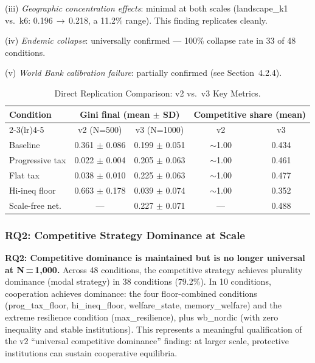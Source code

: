 \documentclass[12pt, letterpaper]{article}
\begin{document}
\noindent
(iii) \emph{Geographic concentration effects}: minimal at both scales
(landscape\_k1 vs.\ k6: 0.196\,$\to$\,0.218, a 11.2\% range). This finding
replicates cleanly.

\noindent
(iv) \emph{Endemic collapse}: universally confirmed --- 100\% collapse
rate in 33 of 48 conditions.

\noindent
(v) \emph{World Bank calibration failure}: partially confirmed (see
Section~4.2.4).

\begin{table}[h]
\centering
\caption{Direct Replication Comparison: v2 vs.\ v3 Key Metrics.}
\label{tab:replication}
\small
\begin{tabular}{lcccc}
\toprule
Condition & \multicolumn{2}{c}{Gini final (mean $\pm$ SD)} &
  \multicolumn{2}{c}{Competitive share (mean)} \\
\cmidrule(lr){2-3}\cmidrule(lr){4-5}
& v2 (N=500) & v3 (N=1000) & v2 & v3 \\
\midrule
Baseline           & 0.361 $\pm$ 0.086 & 0.199 $\pm$ 0.051 & $\sim$1.00 & 0.434 \\
Progressive tax    & 0.022 $\pm$ 0.004 & 0.205 $\pm$ 0.063 & $\sim$1.00 & 0.461 \\
Flat tax           & 0.038 $\pm$ 0.010 & 0.225 $\pm$ 0.063 & $\sim$1.00 & 0.477 \\
Hi-ineq floor      & 0.663 $\pm$ 0.178 & 0.039 $\pm$ 0.074 & $\sim$1.00 & 0.352 \\
Scale-free net.    & ---               & 0.227 $\pm$ 0.071 & ---         & 0.488 \\
\bottomrule
\end{tabular}
\end{table}

\subsubsection{RQ2: Competitive Strategy Dominance at Scale}

\textbf{RQ2: Competitive dominance is maintained but is no longer
universal at N\,=\,1,000.} Across 48 conditions, the competitive
strategy achieves plurality dominance (modal strategy) in 38 conditions
(79.2\%). In 10 conditions, cooperation achieves dominance: the four
floor-combined conditions (prog\_tax\_floor, hi\_ineq\_floor,
welfare\_state, memory\_welfare) and the extreme resilience condition
(max\_resilience), plus wb\_nordic (with zero inequality and stable
institutions). This represents a meaningful qualification of the v2
``universal competitive dominance'' finding: at larger scale, protective
institutions can sustain cooperative equilibria.
\end{document}
